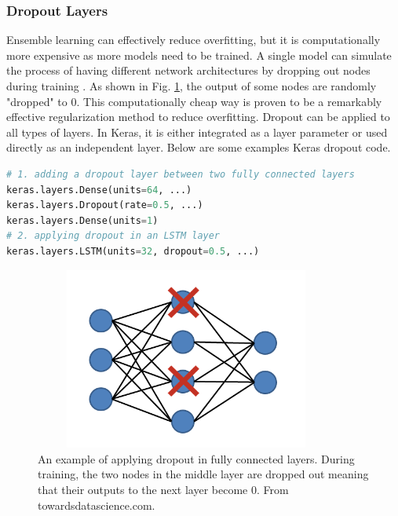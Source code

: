 \subsubsection{Dropout Layers}
Ensemble learning can effectively reduce overfitting, but it is computationally more expensive as more models need to be trained. A single model can simulate the process of having different network architectures by dropping out nodes during training \cite{srivastava2014dropout}. As shown in Fig. \ref{fig_dropout}, the output of some nodes are randomly "dropped" to 0. This computationally cheap way is proven to be a remarkably effective regularization method to reduce overfitting. Dropout can be applied to all types of layers. In Keras, it is either integrated as a layer parameter or used directly as an independent layer. Below are some examples Keras dropout code.
\begin{lstlisting}[language=python,frame=single]
# 1. adding a dropout layer between two fully connected layers
keras.layers.Dense(units=64, ...)
keras.layers.Dropout(rate=0.5, ...)
keras.layers.Dense(units=1)
# 2. applying dropout in an LSTM layer
keras.layers.LSTM(units=32, dropout=0.5, ...)
\end{lstlisting}
\begin{figure}[h!]
\begin{center}
\includegraphics[height = 6cm, width = 10cm]{img/dropout.png}
\caption[An example of applying dropout in fully connected layers]{An example of applying dropout in fully connected layers. During training, the two nodes in the middle layer are dropped out meaning that their outputs to the next layer become 0. From towardsdatascience.com.\label{fig_dropout}}
\end{center}
\end{figure}
